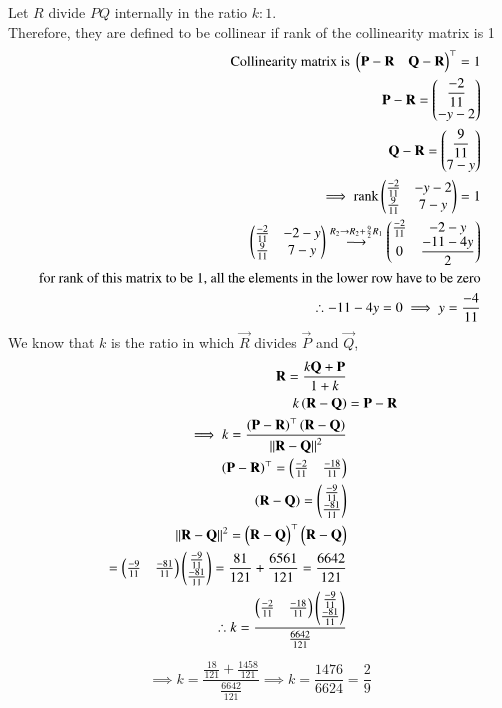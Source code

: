 \documentclass[journal,12pt,onecolumn]{IEEEtran}
\theoremstyle{remark}
\begin{document}
Let $R$ divide $PQ$ internally in the ratio $k:1$.\\
Therefore, they are defined to be collinear if rank of the collinearity matrix is 1
\begin{align*}
    \text{Collinearity matrix is }\myvec{\vec{P}- \vec{R} & \vec{Q}-\vec{R}}^{\top}=1\\
    \vec{P}-\vec{R}=\myvec{\dfrac{-2}{11} \\ -y-2}\\
    \vec{Q}-\vec{R}=\myvec{\dfrac{9}{11} \\ 7-y}\\
    \implies \text{rank}\myvec{\frac{-2}{11} & -y-2 \\ \frac{9}{11} & 7-y} = 1\\
    \myvec{\frac{-2}{11} & -2-y \\ \frac{9}{11} & 7-y}\overset{R_2 \rightarrow R_2 + \frac{9}{2}R_1}{\longrightarrow} \myvec{\frac{-2}{11} & -2-y \\ 0 & \dfrac{-11-4y}{2}}\\
    \text{for rank of this matrix to be 1, all the elements in the lower row have to be zero}\\
    \therefore -11-4y=0 \implies
    y=\dfrac{-4}{11}
\end{align*}
We know that $k$ is the ratio in which $\vec{R}$ divides $\vec{P}$ and $\vec{Q}$,
\begin{align*}
   \vec{R}=\dfrac{k\vec{Q}+\vec{P}}{1+k}\\
   k\brak{\vec{R}-\vec{Q}}&= \vec{P}-\vec{R}\\
   \implies k =\dfrac{\brak{\vec{P}-\vec{R}}^{\top}\brak{\vec{R}-\vec{Q}}}{\norm{\vec{R}-\vec{Q}}^2}\\
   \brak{\vec{P}-\vec{R}}^{\top}=\myvec{\frac{-2}{11} & \frac{-18}{11}}\\
   \brak{\vec{R}-\vec{Q}}=\myvec{\frac{-9}{11} \\ \frac{-81}{11}}\\
   \norm{\vec{R}-\vec{Q}}^2=\myvec{\vec{R}-\vec{Q}}^{\top} \myvec{\vec{R}-\vec{Q}}\\=\myvec{\frac{-9}{11} & \frac{-81}{11}}\myvec{\frac{-9}{11} \\ \frac{-81}{11}}=\frac{81}{121} + \frac{6561}{121}=\frac{6642}{121}\\
   \therefore k=\dfrac{\myvec{\frac{-2}{11} & \frac{-18}{11}}\myvec{\frac{-9}{11} \\ \frac{-81}{11}}}{\frac{6642}{121}}\\
   \end{align*}
\begin{align*}
   \implies k=\dfrac{\frac{18}{121} + \frac{1458}{121}}{\frac{6642}{121}}
   \implies k=\dfrac{1476}{6624}=\dfrac{2}{9}
\end{align*}
\end{document}
